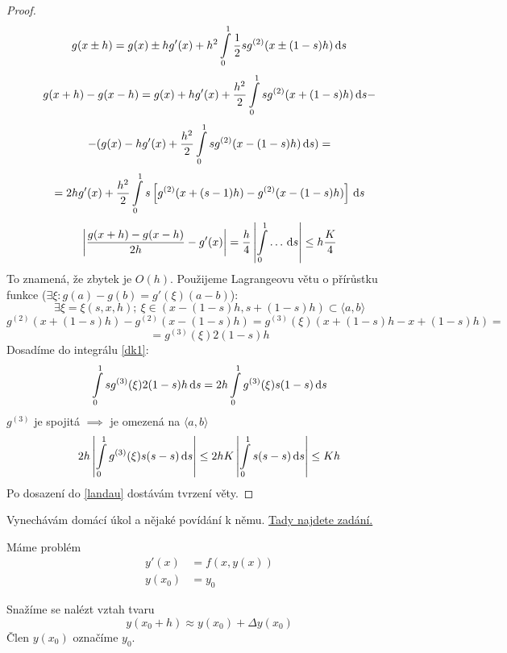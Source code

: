 	\begin{proof}
		$$ g(x \pm h) = g(x) \pm h g'(x) + h^2 \int\limits_0^1 \frac{1}{2} s g^{(2)}
		(x \pm (1-s) h)\,\mathrm{d}s$$
		$$ g(x+h) - g(x-h) = g(x) + hg'(x) + \frac{h^2}{2} \int\limits_0^1 s g^{(2)} (x + (1-s) h)\,\mathrm{d}s -$$
		$$ - ( g(x) - hg'(x) + \frac{h^2}{2} \int\limits_0^1 s g^{(2)} (x - (1-s) h)\,\mathrm{d}s) =$$
		\begin{equation} \label{dk1}
			 = 2hg'(x) + \frac{h^2}{2} \int\limits_0^1 s \left[ g^{(2)} (x + (s-1)h) - g^{(2)}
			(x - (1-s)h) \right]\,\mathrm{d}s
		\end{equation}
		$$ \left| \frac{g(x+h) - g(x-h)}{2h} - g'(x)\right| = \frac{h}{4} \left|
		\int\limits_0^1 \dots\,\mathrm{d}s\right| \leq h \frac{K}{4} $$
		To znamená, že zbytek je $O(h)$. Použijeme Lagrangeovu větu o přírůstku funkce
		($\exists \xi:g(a) - g(b) = g'(\xi)(a -b)$):
		$$ \exists \xi= \xi(s,x,h);\ \xi \in (x- (1-s)h, s+(1-s)h) \subset \langle a,b \rangle$$
		$$ g^{(2)} (x+(1-s)h) - g^{(2)} (x-(1-s)h) = g^{(3)} (\xi) (x+(1-s)h - x +(1-s)h) =$$
		$$ = g^{(3)}(\xi) 2 (1-s) h$$
		Dosadíme do integrálu \eqref{dk1}:
		$$ \int\limits_0^1 s g^{(3)} (\xi) 2 (1-s)h\,\mathrm{d}s = 2h \int\limits_0^1 g^{(3)} (\xi) s (1-s)\,\mathrm{d}s $$
		$g^{(3)}$ je spojitá $\implies$ je omezená na $\langle a,b \rangle$
		$$ 2h \left| \int\limits_0^1 g^{(3)}(\xi) s(s-s)\,\mathrm{d}s \right| \leq 2hK \left| \int\limits_0^1 s(s-s)\,\mathrm{d}s \right|
		\leq Kh$$
		Po dosazení do \eqref{landau} dostávám tvrzení věty.
	\end{proof}
	
	\begin{note}
		Vynechávám domácí úkol a nějaké povídání k němu. \href{http://geraldine.fjfi.cvut.cz/~oberhuber/data/vyuka/num/dcv1.pdf}{Tady najdete zadání.}
	\end{note}
	
	
	Máme problém
	\begin{align*}
		y'(x) &= f(x,y(x)) \\
		y(x_0) &= y_0
	\end{align*}

	Snažíme se nalézt vztah tvaru
	$$ y(x_0 + h) \approx y(x_0) + \Delta y(x_0)$$
	Člen $y(x_0)$ označíme $y_0$.
	
